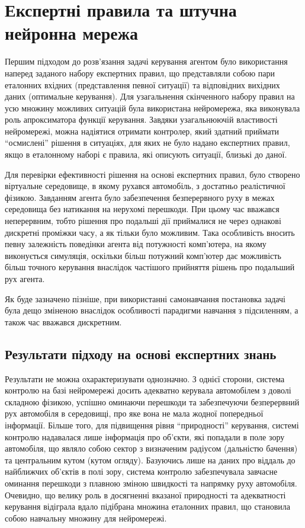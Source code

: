 \documentclass[a4paper,10pt,fleqn]{article}
\begin{document}
\section{Експертні правила та штучна нейронна мережа}

Першим підходом до розв'язання задачі керування агентом було використання наперед заданого набору експертних правил, що представляли собою пари еталонних вхідних (представлення певної ситуації) та відповідних вихідних даних (оптимальне керування). Для узагальнення скінченного набору правил на усю множину можливих ситуацій була використана нейромережа, яка виконувала роль апроксиматора функції керування. Завдяки узагальнюючій властивості нейромережі, можна надіятися отримати контролер, який здатний приймати ``осмислені'' рішення в ситуаціях, для яких не було надано експертних правил, якщо в еталонному наборі є правила, які описують ситуації, близькі до даної.

Для перевірки ефективності рішення на основі експертних правил, було створено віртуальне середовище, в якому рухався автомобіль, з достатньо реалістичної фізикою. Завданням агента було забезпечення безперервного руху в межах середовища без натикання на нерухомі перешкоди. При цьому час вважався неперервним, тобто рішення про подальші дії приймалися не через однакові дискретні проміжки часу, а як тільки було можливим. Така особливість вносить певну залежність поведінки агента від потужності комп'ютера, на якому виконується симуляція, оскільки більш потужний комп'ютер дає можливість більш точного керування внаслідок частішого прийняття рішень про подальший рух агента. 

Як буде зазначено пізніше, при використанні самонавчання постановка задачі була дещо зміненою внаслідок особливості парадигми навчання з підсиленням, а також час вважався дискретним. 

\subsection{Результати підходу на основі експертних знань}

Результати не можна охарактеризувати однозначно. З однієї сторони, система контролю на базі нейромережі досить адекватно керувала автомобілем з доволі складною фізикою, успішно оминаючи перешкоди та забезпечуючи безперервний рух автомобіля в середовищі, про яке вона не мала жодної попередньої інформації. Більше того, для підвищення рівня ``природності'' керування, системі контролю надавалася лише інформація про об'єкти, які попадали в поле зору автомобіля, що являло собою сектор з визначеним радіусом (дальністю бачення) та центральним кутом (кутом огляду). Базуючись лише на даних про віддаль до найближчих об'єктів в полі зору, система контролю забезпечувала завчасне оминання перешкоди з плавною зміною швидкості та напрямку руху автомобіля. Очевидно, що велику роль в досягненні вказаної природності та адекватності керування відіграла вдало підібрана множина еталонних правил, що становила собою навчальну множину для нейромережі.
\end{document}
